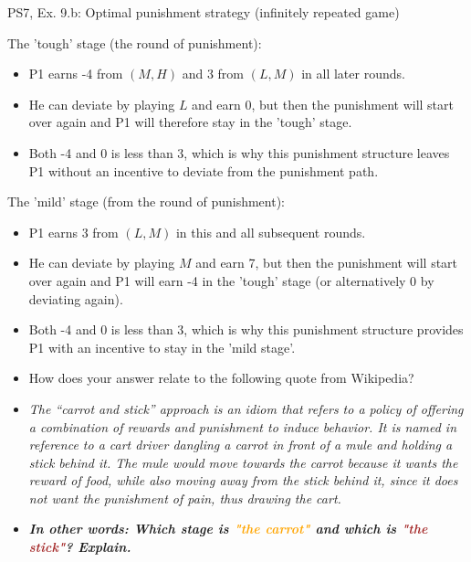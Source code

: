 \begin{frame}{PS7, Ex. 9.b: Optimal punishment strategy (infinitely repeated game)}
    \begin{multicols}{2}
      The 'tough' stage (the  round of punishment):\vspace{-6pt}
      \begin{itemize}
        \item P1 earns -4 from $(M, H)$ and 3 from $(L, M)$ in all later rounds.
        \item He can deviate by playing $L$ and earn 0, but then the punishment will start over again and P1 will therefore stay in the 'tough' stage.
        \item Both -4 and 0 is less than 3, which is why this punishment structure leaves P1 without an incentive to deviate from the punishment path.
      \end{itemize}
      \vfill\null\columnbreak
      The 'mild' stage (from the  round of punishment):\vspace{-6pt}
      \begin{itemize}
        \item P1 earns 3 from $(L, M)$ in this and all subsequent rounds.
        \item He can deviate by playing $M$ and earn 7, but then the punishment will start over again and P1 will earn -4 in the 'tough' stage (or alternatively 0 by deviating again).
        \item Both -4 and 0 is less than 3, which is why this punishment structure provides P1 with an incentive to stay in the 'mild stage'.
      \end{itemize}
      \vfill\null
    \end{multicols}
    \vspace{-28pt}
    \begin{itemize}
      \item[(b)] How does your answer relate to the following quote from Wikipedia?
      \item[] \textit{The “carrot and stick” approach is an idiom that refers to a policy of offering a combination of rewards and punishment to induce behavior. It is named in reference to a cart driver dangling a carrot in front of a mule and holding a stick behind it. The mule would move towards the carrot because it wants the reward of food, while also moving away from the stick behind it, since it does not want the punishment of pain, thus drawing the cart.}
      \item[] \textbf{\textit{In other words: Which stage is \textcolor{orange}{"the carrot"} and which is \textcolor{brown}{"the stick"}? Explain.}}
    \end{itemize}
\end{frame}
